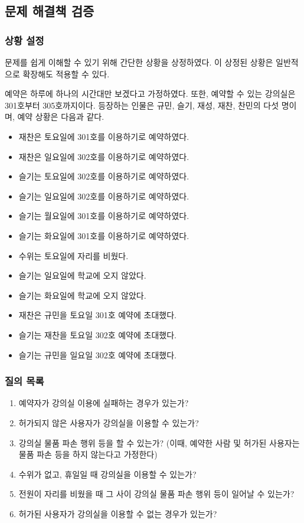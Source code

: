 \documentclass[11pt,a4paper]{article}
\begin{document}
\subsection{문제 해결책 검증}

\subsubsection{상황 설정}
문제를 쉽게 이해할 수 있기 위해 간단한 상황을 상정하였다. 이 상정된 상황은
일반적으로 확장해도 적용할 수 있다.

예약은 하루에 하나의 시간대만 보겠다고 가정하였다. 또한, 예약할 수 있는
강의실은 301호부터 305호까지이다. 등장하는 인물은 규민, 슬기, 재성, 재찬,
찬민의 다섯 명이며, 예약 상황은 다음과 같다.

\begin{itemize}
\item 재찬은 토요일에 301호를 이용하기로 예약하였다.
\item 재찬은 일요일에 302호를 이용하기로 예약하였다.
\item 슬기는 토요일에 302호를 이용하기로 예약하였다.
\item 슬기는 일요일에 302호를 이용하기로 예약하였다.
\item 슬기는 월요일에 301호를 이용하기로 예약하였다.
\item 슬기는 화요일에 301호를 이용하기로 예약하였다.
\item 수위는 토요일에 자리를 비웠다.
\item 슬기는 일요일에 학교에 오지 않았다.
\item 슬기는 화요일에 학교에 오지 않았다.
\item 재찬은 규민을 토요일 301호 예약에 초대했다.
\item 슬기는 재찬을 토요일 302호 예약에 초대했다.
\item 슬기는 규민을 일요일 302호 예약에 초대했다.
\end{itemize}

\subsubsection{질의 목록}
\begin{enumerate}
\item 예약자가 강의실 이용에 실패하는 경우가 있는가?
\item 허가되지 않은 사용자가 강의실을 이용할 수 있는가?
\item 강의실 물품 파손 행위 등을 할 수 있는가? (이때, 예약한 사람 및 허가된
사용자는 물품 파손 등을 하지 않는다고 가정한다)
\item 수위가 없고, 휴일일 때 강의실을 이용할 수 있는가?
\item 전원이 자리를 비웠을 때 그 사이 강의실 물품 파손 행위 등이 일어날 수
있는가?
\item 허가된 사용자가 강의실을 이용할 수 없는 경우가 있는가?
\end{enumerate}
\end{document}
